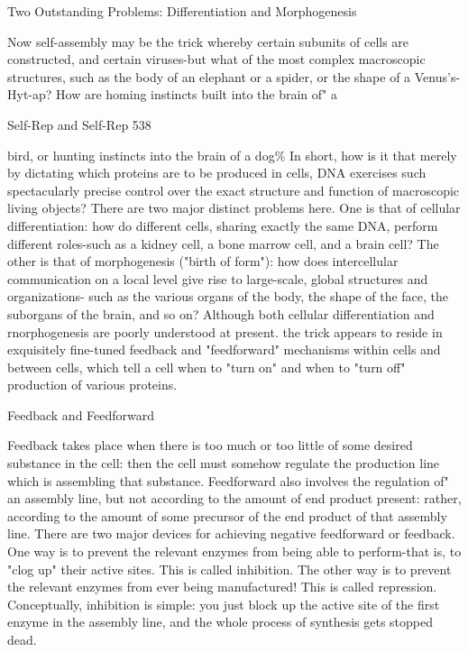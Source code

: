 {                               Two Outstanding Problems:
                            Differentiation and Morphogenesis

Now self-assembly may be the trick whereby certain subunits of cells are constructed, and
certain viruses-but what of the most complex macroscopic structures, such as the body of an
elephant or a spider, or the shape of a Venus's-Hyt-ap? How are homing instincts built into
the brain of" a




Self-Rep and Self-Rep                                                                      538

bird, or hunting instincts into the brain of a dog\% In short, how is it that merely by dictating
which proteins are to be produced in cells, DNA exercises such spectacularly precise control
over the exact structure and function of macroscopic living objects? There are two major
distinct problems here. One is that of cellular differentiation: how do different cells, sharing
exactly the same DNA, perform different roles-such as a kidney cell, a bone marrow cell, and
a brain cell? The other is that of morphogenesis ("birth of form"): how does intercellular
communication on a local level give rise to large-scale, global structures and organizations-
such as the various organs of the body, the shape of the face, the suborgans of the brain, and
so on? Although both cellular differentiation and rnorphogenesis are poorly understood at
present. the trick appears to reside in exquisitely fine-tuned feedback and "feedforward"
mechanisms within cells and between cells, which tell a cell when to "turn on" and when to
"turn off" production of various proteins.

                                Feedback and Feedforward

Feedback takes place when there is too much or too little of some desired substance in the
cell: then the cell must somehow regulate the production line which is assembling that
substance. Feedforward also involves the regulation of" an assembly line, but not according
to the amount of end product present: rather, according to the amount of some precursor of
the end product of that assembly line. There are two major devices for achieving negative
feedforward or feedback. One way is to prevent the relevant enzymes from being able to
perform-that is, to "clog up" their active sites. This is called inhibition. The other way is to
prevent the relevant enzymes from ever being manufactured! This is called repression.
Conceptually, inhibition is simple: you just block up the active site of the first enzyme in the
assembly line, and the whole process of synthesis gets stopped dead.

}
